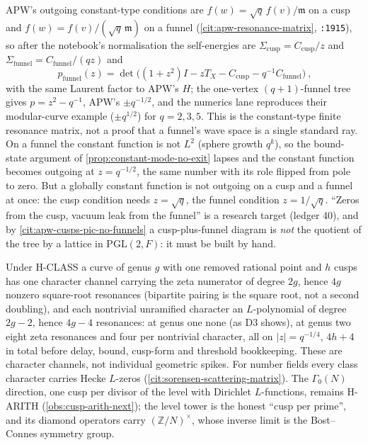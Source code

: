 \begin{proposition}
\label{prop:funnel-self-energy}
APW's outgoing constant-type conditions are $f(w) = \sqrt q\,f(v)/\mathfrak m$ on a cusp and $f(w) = f(v)/(\sqrt q\,\mathfrak m)$ on a
funnel (\cref{cit:apw-resonance-matrix}, \texttt{:1915}), so after the notebook's normalisation the self-energies
are $\varSigma_{\mathrm{cusp}} = C_{\mathrm{cusp}}/z$ and $\varSigma_{\mathrm{funnel}} = C_{\mathrm{funnel}}/(qz)$ and
\[
\boxed{\ p_{\mathrm{funnel}}(z) = \det\big((1+z^2)I-zT_X-C_{\mathrm{cusp}}-q^{-1}C_{\mathrm{funnel}}\big)\ },
\]
with the same Laurent factor to APW's $H$; the one-vertex $(q+1)$-funnel tree gives $p = z^2-q^{-1}$, APW's
$\pm q^{-1/2}$, and the numerics lane reproduces their modular-curve example ($\pm q^{1/2}$) for $q = 2,3,5$. This is
the constant-type finite resonance matrix, not a proof that a funnel's wave space is a single standard ray. On a
funnel the constant function is not $L^2$ (sphere growth $q^k$), so the bound-state argument of
\cref{prop:constant-mode-no-exit} lapses and the constant function becomes outgoing at $z = q^{-1/2}$, the same
number with its role flipped from pole to zero. But a globally constant function is not outgoing on a cusp and a
funnel at once: the cusp condition needs $z = \sqrt q$, the funnel condition $z = 1/\sqrt q$. ``Zeros from the cusp,
vacuum leak from the funnel'' is a research target (ledger 40), and by \cref{cit:apw-cusps-pic-no-funnels} a
cusp-plus-funnel diagram is \emph{not} the quotient of the tree by a lattice in $\mathrm{PGL}(2,F)$: it must be built by
hand.
\end{proposition}

\begin{observation}
\label{obs:genus-class-prediction}
Under H-CLASS a curve of genus $g$ with one removed rational point and $h$ cusps has one character channel
carrying the zeta numerator of degree $2g$, hence $4g$ nonzero square-root resonances (bipartite pairing is the
square root, not a second doubling), and each nontrivial unramified character an $L$-polynomial of degree $2g-2$,
hence $4g-4$ resonances: at genus one none (as $\mathrm{D3}$ shows), at genus two eight zeta resonances and four per
nontrivial character, all on $|z| = q^{-1/4}$, $4h+4$ in total before delay, bound, cusp-form and threshold
bookkeeping. These are character channels, not individual geometric spikes. For number fields every class
character carries Hecke $L$-zeros (\cref{cit:sorensen-scattering-matrix}). The $\Gamma_0(N)$ direction, one cusp
per divisor of the level with Dirichlet $L$-functions, remains H-ARITH (\cref{obs:cusp-arith-next}); the level tower
is the honest ``cusp per prime'', and its diamond operators carry $(\mathbb Z/N)^\times$, whose inverse limit is the
Bost--Connes symmetry group.
\end{observation}

